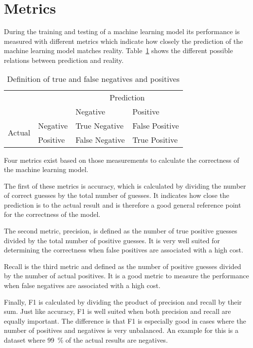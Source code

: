 \section{Metrics}\label{sec:metrics}
During the training and testing of a machine learning model its performance is measured with different metrics which indicate how closely the prediction of the machine learning model matches reality. Table~\ref{table:true-false-neg-pos} shows the different possible relations between prediction and reality.

\begin{table}[ht]
  \centering
  \caption{Definition of true and false negatives and positives} %
  \begin{tabular}{ll|l|l} %
                            & \multicolumn{1}{c}{} & \multicolumn{2}{c}{Prediction}                  \\
                            &                      & Negative                       & Positive       \\ \cline{2-4}
    \multirow{2}{*}{Actual} & Negative             & True Negative                  & False Positive \\ \cline{2-4}
                            & Positive             & False Negative                 & True Positive  \\
  \end{tabular}\label{table:true-false-neg-pos}
\end{table}

Four metrics exist based on those measurements to calculate the correctness of the machine learning model.

The first of these metrics is accuracy, which is calculated by dividing the number of correct guesses by the total number of guesses. It indicates how close the prediction is to the actual result and is therefore a good general reference point for the correctness of the model.

The second metric, precision, is defined as the number of true positive guesses divided by the total number of positive guesses. It is very well suited for determining the correctness when false positives are associated with a high cost.

Recall is the third metric and defined as the number of positive guesses divided by the number of actual positives. It is a good metric to measure the performance when false negatives are associated with a high cost.

Finally, F1 is calculated by dividing the product of precision and recall by their sum. Just like accuracy, F1 is well suited when both precision and recall are equally important. The difference is that F1 is especially good in cases where the number of positives and negatives is very unbalanced. An example for this is a dataset where \SI{99}{\percent} of the actual results are negatives.
